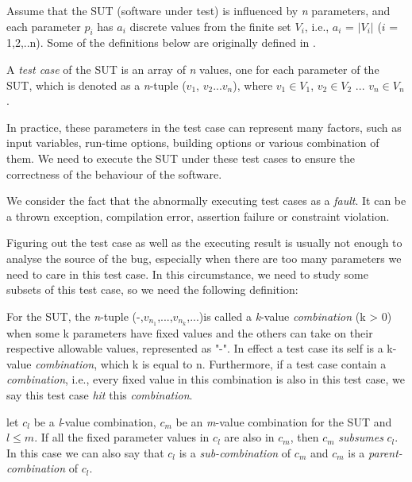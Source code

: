 \documentclass{sig-alternate}
\begin{document}
Assume that the SUT (software under test) is influenced by \emph{n} parameters, and each parameter $p_{i}$ has $a_{i}$ discrete values from the finite set $V_{i}$, i.e., $a_{i}$ = $|V_{i}|$ ($i$ = 1,2,..n). Some of the definitions below are originally defined in \cite{nie2011survey}.

\begin{definition}
A \emph{test case} of the SUT is an array of \emph{n} values, one for each parameter of the SUT, which is denoted as a \emph{n}-tuple ($v_{1}$, $v_{2}$...$v_{n}$), where $v_{1}\in V_{1}$, $v_{2} \in V_{2}$ ... $v_{n} \in V_{n}$.
\end{definition}

In practice, these parameters in the test case can represent many factors, such as input variables, run-time options, building options or various combination of them. We need to execute the SUT under these test cases to ensure the correctness of the behaviour of the software.

\begin{definition}
We consider the fact that the abnormally executing test cases as a \emph{fault}. It can be a thrown exception, compilation error, assertion failure or constraint violation.
\end{definition}

Figuring out the test case as well as the executing result is usually not enough to analyse the source of the bug, especially when there are too many parameters we need to care in this test case. In this circumstance, we need to study some subsets of this test case, so we need the following definition:

\begin{definition}
For the SUT, the \emph{n}-tuple (-,$v_{n_{1}}$,...,$v_{n_{k}}$,...)is called a \emph{k}-value \emph{combination} (k > 0) when some k parameters have fixed values and the others can take on their respective allowable values, represented as "-". In effect a test case its self is a k-value \emph{combination}, which k is equal to n. Furthermore, if a test case contain a \emph{combination}, i.e., every fixed value in this combination is also in this test case, we say this test case \emph{hit} this \emph{combination}.
\end{definition}

\begin{definition}
let $c_{l}$ be a \emph{l}-value combination, $c_{m}$ be an \emph{m}-value combination for the SUT and $l \leq m$. If all the fixed parameter values in $c_{l}$ are also in $c_{m}$, then $c_{m}$ \emph{subsumes} $c_{l}$. In this case we can also say that $c_{l}$ is a \emph{sub-combination} of $c_{m}$ and $c_{m}$ is a \emph{parent-combination} of $c_{l}$.
\end{definition}
\end{document}
